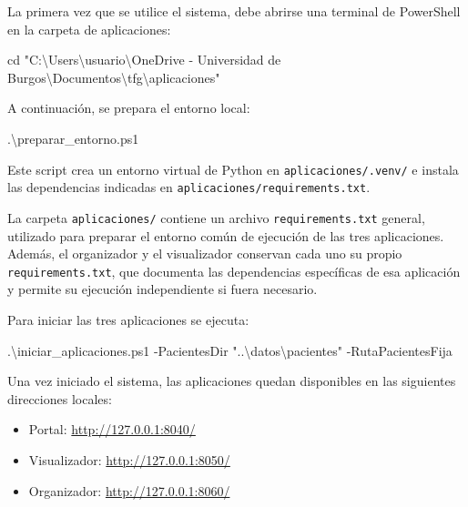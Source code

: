 \documentclass[
  spanish,
  a4paper,
  12pt,
  twoside]{memoir}
\newenvironment{Shaded}{\begin{snugshade}}{\end{snugshade}}
\newcommand{\FunctionTok}[1]{\textcolor[rgb]{0.28,0.35,0.67}{#1}}
\newcommand{\NormalTok}[1]{\textcolor[rgb]{0.00,0.23,0.31}{#1}}
\newcommand{\OperatorTok}[1]{\textcolor[rgb]{0.37,0.37,0.37}{#1}}
\newcommand{\StringTok}[1]{\textcolor[rgb]{0.13,0.47,0.30}{#1}}
\providecommand{\tightlist}{%
  \setlength{\itemsep}{0pt}\setlength{\parskip}{0pt}}
\begin{document}
La primera vez que se utilice el sistema, debe abrirse una terminal de
PowerShell en la carpeta de aplicaciones:

\begin{Shaded}
\begin{Highlighting}[]
\FunctionTok{cd} \StringTok{"C:\textbackslash{}Users\textbackslash{}usuario\textbackslash{}OneDrive {-} Universidad de Burgos\textbackslash{}Documentos\textbackslash{}tfg\textbackslash{}aplicaciones"}
\end{Highlighting}
\end{Shaded}

A continuación, se prepara el entorno local:

\begin{Shaded}
\begin{Highlighting}[]
\OperatorTok{.}\NormalTok{\textbackslash{}preparar\_entorno}\OperatorTok{.}\FunctionTok{ps1}
\end{Highlighting}
\end{Shaded}

Este script crea un entorno virtual de Python en
\texttt{aplicaciones/.venv/} e instala las dependencias indicadas en
\texttt{aplicaciones/requirements.txt}.

La carpeta \texttt{aplicaciones/} contiene un archivo
\texttt{requirements.txt} general, utilizado para preparar el entorno
común de ejecución de las tres aplicaciones. Además, el organizador y el
visualizador conservan cada uno su propio \texttt{requirements.txt}, que
documenta las dependencias específicas de esa aplicación y permite su
ejecución independiente si fuera necesario.

Para iniciar las tres aplicaciones se ejecuta:

\begin{Shaded}
\begin{Highlighting}[]
\OperatorTok{.}\NormalTok{\textbackslash{}iniciar\_aplicaciones}\OperatorTok{.}\FunctionTok{ps1} \OperatorTok{{-}}\NormalTok{PacientesDir }\StringTok{"..\textbackslash{}datos\textbackslash{}pacientes"} \OperatorTok{{-}}\NormalTok{RutaPacientesFija}
\end{Highlighting}
\end{Shaded}

Una vez iniciado el sistema, las aplicaciones quedan disponibles en las
siguientes direcciones locales:

\begin{itemize}
\tightlist
\item
  Portal: \url{http://127.0.0.1:8040/}
\item
  Visualizador: \url{http://127.0.0.1:8050/}
\item
  Organizador: \url{http://127.0.0.1:8060/}
\end{itemize}
\end{document}
